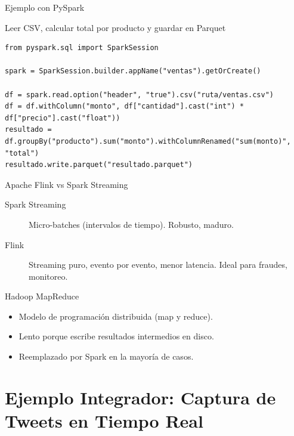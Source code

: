 \documentclass[aspectratio=169, 10pt, xcolor=table]{beamer}
\begin{document}
\begin{frame}[fragile]{Ejemplo con PySpark}
    \begin{block}{Leer CSV, calcular total por producto y guardar en Parquet}
        \begin{lstlisting}[style=python]
from pyspark.sql import SparkSession

spark = SparkSession.builder.appName("ventas").getOrCreate()

df = spark.read.option("header", "true").csv("ruta/ventas.csv")
df = df.withColumn("monto", df["cantidad"].cast("int") * df["precio"].cast("float"))
resultado = df.groupBy("producto").sum("monto").withColumnRenamed("sum(monto)", "total")
resultado.write.parquet("resultado.parquet")
        \end{lstlisting}
    \end{block}
\end{frame}

\begin{frame}{Apache Flink vs Spark Streaming}
    \begin{description}
        \item[Spark Streaming] Micro-batches (intervalos de tiempo). Robusto, maduro.
        \item[Flink] Streaming puro, evento por evento, menor latencia. Ideal para fraudes, monitoreo.
    \end{description}
\end{frame}

\begin{frame}{Hadoop MapReduce}
    \begin{itemize}
        \item Modelo de programación distribuida (map y reduce).
        \item Lento porque escribe resultados intermedios en disco.
        \item Reemplazado por Spark en la mayoría de casos.
    \end{itemize}
\end{frame}

\section{Ejemplo Integrador: Captura de Tweets en Tiempo Real}
\end{document}
